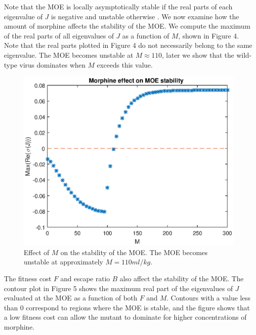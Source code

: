 \documentclass[11pt, oneside]{article}    %
\begin{document}
\vspace{5mm}

Note that the MOE is locally asymptotically stable if the real parts of each eigenvalue of $J$ is negative and unstable otherwise  \cite{Perko, Smith}. We now examine how the amount of morphine affects the stability of the MOE. We compute the maximum of the real parts of all eigenvalues of $J$ as a function of $M$, shown in Figure 4. Note that the real parts plotted in Figure 4 do not necessarily belong to the same eigenvalue. The MOE becomes unstable at $M \approx 110$, later we show that the wild-type virus dominates when $M$ exceeds this value.


\begin{figure}[H]
\centering
\includegraphics[scale=0.65]{MOE_morph.eps}
\caption{Effect of $M$ on the stability of the MOE. The MOE becomes unstable at approximately $M=110 ml/kg$.}
\end{figure}

The fitness cost $F$ and escape ratio $B$ also affect the stability of the MOE. The contour plot in Figure 5 shows the maximum real part of the eigenvalues of $J$ evaluated at the MOE as a function of both $F$ and $M$. Contours with a value less than 0 correspond to regions where the MOE is stable, and the figure shows that a low fitness cost can allow the mutant to dominate for higher concentrations of morphine. 
\end{document}
